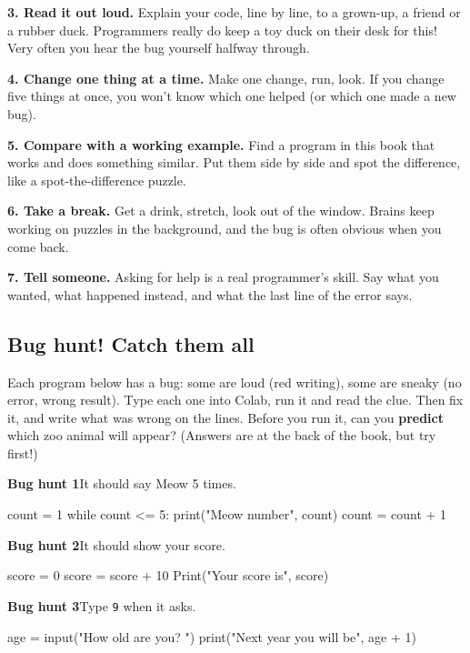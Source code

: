 \textbf{3. Read it out loud.} Explain your code, line by line, to a grown-up, a friend or a rubber duck. Programmers really do keep a toy duck on their desk for this! Very often you hear the bug yourself halfway through.

\textbf{4. Change one thing at a time.} Make one change, run, look. If you change five things at once, you won't know which one helped (or which one made a new bug).

\textbf{5. Compare with a working example.} Find a program in this book that works and does something similar. Put them side by side and spot the difference, like a spot-the-difference puzzle.

\textbf{6. Take a break.} Get a drink, stretch, look out of the window. Brains keep working on puzzles in the background, and the bug is often obvious when you come back.

\textbf{7. Tell someone.} Asking for help is a real programmer's skill. Say what you wanted, what happened instead, and what the last line of the error says.


\clearpage
\subsection*{Bug hunt! Catch them all}

Each program below has a bug: some are loud (red writing), some are sneaky (no error, wrong result). Type each one into Colab, run it and read the clue. Then fix it, and write what was wrong on the lines. Before you run it, can you \textbf{predict} which zoo animal will appear? (Answers are at the back of the book, but try first!)

\newcommand{\bzhunt}[2]{\par{}\smallskip\textbf{Bug hunt #1}\quad #2\par\nopagebreak}

\bzhunt{1}{It should say Meow 5 times.}
\begin{code}
count = 1
while count <= 5:
print("Meow number", count)
    count = count + 1
\end{code}
\bzruled

\bzhunt{2}{It should show your score.}
\begin{code}
score = 0
score = score + 10
Print("Your score is", score)
\end{code}
\bzruled

\bzhunt{3}{Type \texttt{9} when it asks.}
\begin{code}
age = input("How old are you? ")
print("Next year you will be", age + 1)
\end{code}
\bzruled


